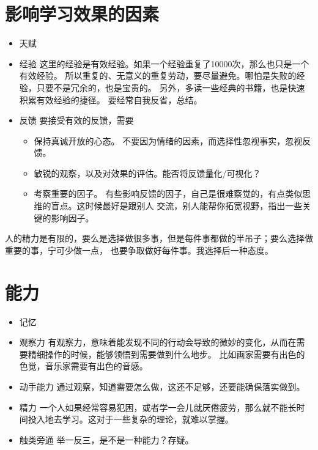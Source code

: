 \documentclass{book}
\begin{document}
\section{影响学习效果的因素}
\begin{itemize}
    \item 天赋
    \item 经验 \newline
        这里的经验是有效经验。如果一个经验重复了10000次，那么也只是一个有效经验。
        所以重复的、无意义的重复劳动，要尽量避免。哪怕是失败的经验，只要不是冗余的，也是宝贵的。
        另外，多读一些经典的书籍，也是快速积累有效经验的捷径。
        要经常自我反省，总结。
    \item 反馈 \newline
        要接受有效的反馈，需要
        \begin{itemize}
            \item 保持真诚开放的心态。
                不要因为情绪的因素，而选择性忽视事实，忽视反馈。
            \item 敏锐的观察，以及对效果的评估。能否将反馈量化/可视化？
            \item 考察重要的因子。
                有些影响反馈的因子，自己是很难察觉的，有点类似思维的盲点。这时候最好是跟别人
                交流，别人能帮你拓宽视野，指出一些关键的影响因子。
        \end{itemize}
\end{itemize}
人的精力是有限的，要么是选择做很多事，但是每件事都做的半吊子；要么选择做重要的事，宁可少做一点，
也要争取做好每件事。我选择后一种态度。

\section{能力}
\begin{itemize}
    \item 记忆
    \item 观察力 \newline
        有观察力，意味着能发现不同的行动会导致的微妙的变化，从而在需要精细操作的时候，能够领悟到需要做到什么地步。
        比如画家需要有出色的色觉，音乐家需要有出色的音感。
    \item 动手能力 \newline
        通过观察，知道需要怎么做，这还不足够，还要能确保落实做到。
    \item 精力 \newline
        一个人如果经常容易犯困，或者学一会儿就厌倦疲劳，那么就不能长时间投入地去学习。这对于一些复杂的理论，就难以掌握。
    \item 触类旁通 \newline
        举一反三，是不是一种能力？存疑。
\end{itemize}
\end{document}
